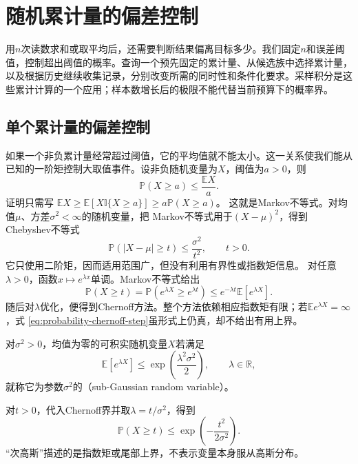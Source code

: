 \section{随机累计量的偏差控制}
\label{sec:probability-averages-errors}
\label{sec:rv-aggregation}
用\(n\)次读数求和或取平均后，还需要判断结果偏离目标多少。我们固定\(n\)和误差阈值，控制超出阈值的概率。查询一个预先固定的累计量、从候选族中选择累计量，以及根据历史继续收集记录，分别改变所需的同时性和条件化要求。采样积分是这些累计计算的一个应用；样本数增长后的极限不能代替当前预算下的概率界。

\subsection{单个累计量的偏差控制}
\label{sec:probability-basic-tail-bounds}
\label{sec:probability-concentration-inequalities}

如果一个非负累计量经常超过阈值，它的平均值就不能太小。这一关系使我们能从已知的一阶矩控制大取值事件。设非负随机变量为\(X\)，阈值为\(a>0\)，则
\begin{equation}
  \mathbb{P}(X\geq a)
  \leq
  \frac{\mathbb{E}X}{a}.
  \label{eq:probability-markov-inequality}
\end{equation}
证明只需写
\(\mathbb{E}X\geq
\mathbb{E}[X\mathbb{I}\{X\geq a\}]
\geq a\mathbb{P}(X\geq a)\)。
这就是Markov不等式。对均值\(\mu\)、方差\(\sigma^2<\infty\)的随机变量，把
Markov不等式用于\((X-\mu)^2\)，得到Chebyshev不等式
\begin{equation}
  \mathbb{P}(|X-\mu|\geq t)
  \leq\frac{\sigma^2}{t^2},
  \qquad t>0.
  \label{eq:probability-chebyshev-inequality}
\end{equation}
它只使用二阶矩，因而适用范围广，但没有利用有界性或指数矩信息。
对任意\(\lambda>0\)，函数\(x\mapsto e^{\lambda x}\)单调。Markov不等式给出
\begin{equation}
  \mathbb{P}(X\geq t)
  =
  \mathbb{P}(e^{\lambda X}\geq e^{\lambda t})
  \leq
  e^{-\lambda t}\mathbb{E}[e^{\lambda X}].
  \label{eq:probability-chernoff-step}
\end{equation}
随后对\(\lambda\)优化，便得到Chernoff方法。整个方法依赖相应指数矩有限；若\(\mathbb{E}e^{\lambda X}=\infty\)，式
\eqref{eq:probability-chernoff-step}虽形式上仍真，却不给出有用上界。

\begin{definition}[次高斯变量]
  \label{def:probability-subgaussian}
对\(\sigma^2>0\)，均值为零的可积实随机变量\(X\)若满足
\[ \mathbb{E}[e^{\lambda X}]
  \leq\exp\left(\frac{\lambda^2\sigma^2}{2}\right),\qquad \lambda\in\mathbb{R}, \]
就称它为参数\(\sigma^2\)的（sub-Gaussian random variable）。
\end{definition}
对\(t>0\)，代入Chernoff界并取\(\lambda=t/\sigma^2\)，得到
\[ \mathbb{P}(X\geq t)
  \leq\exp\left(-\frac{t^2}{2\sigma^2}\right). \]
“次高斯”描述的是指数矩或尾部上界，不表示变量本身服从高斯分布。

